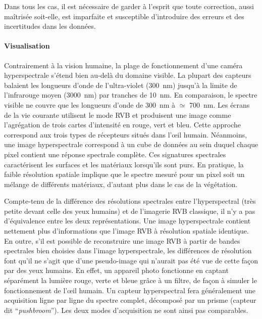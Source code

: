 Dans tous les cas, il est nécessaire de garder à l'esprit que toute correction, aussi maîtrisée soit-elle, est imparfaite et susceptible d'introduire des erreurs et des incertitudes dans les données.

\paragraph{Visualisation}
Contrairement à la vision humaine, la plage de fonctionnement d'une caméra hyperspectrale s'étend bien au-delà du domaine visible. La plupart des capteurs balaient les longueurs d'onde de l'ultra-violet (\SI{300}{\nano\meter}) jusqu'à la limite de l'infrarouge moyen (\SI{3 000}{\nano\meter}) par tranches de \SI{10}{\nano\meter}. En comparaison, le spectre visible ne couvre que les longueurs d'onde de \SI{300}{\nano\meter} à $\simeq$ \SI{700}{\nano\meter}. Les écrans de la vie courante utilisent le mode \gls{RVB} et produisent une image comme l'agrégation de trois cartes d'intensité en rouge, vert et bleu. Cette approche correspond aux trois types de récepteurs situés dans l'\oe{}il humain. Néanmoins, une image hyperspectrale correspond à un cube de données au sein duquel chaque pixel contient une réponse spectrale complète. Ces signatures spectrales caractérisent les surfaces et les matériaux lorsqu'ils sont purs. En pratique, la faible résolution spatiale implique que le spectre mesuré pour un pixel soit un mélange de différents matériaux, d'autant plus dans le cas de la végétation.

Compte-tenu de la différence des résolutions spectrales entre l'hyperspectral (très petite devant celle des yeux humains) et de l'imagerie \gls{RVB} classique, il n'y a pas d'équivalence entre les deux représentations. Une image hyperspectrale contient nettement plus d'informations que l'image \gls{RVB} à résolution spatiale identique. En outre, s'il est possible de reconstruire une image \gls{RVB} à partir de bandes spectrales bien choisies dans l'image hyperspectrale, les différences de résolution font qu'il ne s'agit que d'une pseudo-image qui n'aurait pas été vue de cette façon par des yeux humains. En effet, un appareil photo fonctionne en captant séparément la lumière rouge, verte et bleue grâce à un filtre, de façon à simuler le fonctionnement de l'\oe{}il humain. Un capteur hyperspectral fera généralement une acquisition ligne par ligne du spectre complet, décomposé par un prisme (capteur dit ``\textit{pushbroom}''). Les deux modes d'acquisition ne sont ainsi pas comparables.

